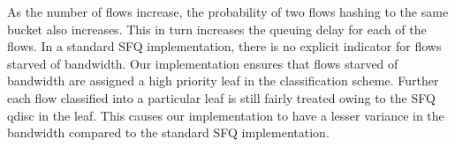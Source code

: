 As the number of flows increase, the probability of two flows hashing to the
same bucket also increases. This in turn increases the queuing delay for each of
the flows. In a standard SFQ implementation, there is no explicit indicator for
flows starved of bandwidth. Our implementation ensures that flows starved of
bandwidth are assigned a high priority leaf in the classification scheme.
Further each flow classified into a particular leaf is still fairly treated
owing to the SFQ qdisc in the leaf. This causes our implementation to have a
lesser variance in the bandwidth compared to the standard SFQ implementation.
